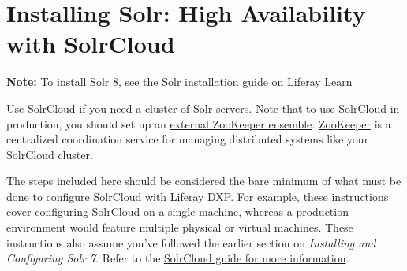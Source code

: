 \section{Installing Solr: High Availability with
SolrCloud}\label{installing-solr-high-availability-with-solrcloud}

\noindent\hrulefill

\textbf{Note:} To install Solr 8, see the Solr installation guide on
\href{https://learn.liferay.com/dxp/latest/en/using-search/installing-and-upgrading-a-search-engine/solr/installing-solr.html}{Liferay
Learn}

\noindent\hrulefill

Use SolrCloud if you need a cluster of Solr servers. Note that to use
SolrCloud in production, you should set up an
\href{https://cwiki.apache.org/confluence/display/solr/Setting+Up+an+External+ZooKeeper+Ensemble}{external
ZooKeeper ensemble}. \href{http://zookeeper.apache.org/}{ZooKeeper} is a
centralized coordination service for managing distributed systems like
your SolrCloud cluster.

The steps included here should be considered the bare minimum of what
must be done to configure SolrCloud with Liferay DXP. For example, these
instructions cover configuring SolrCloud on a single machine, whereas a
production environment would feature multiple physical or virtual
machines. These instructions also assume you've followed the earlier
section on \emph{Installing and Configuring Solr 7}. Refer to the
\href{https://cwiki.apache.org/confluence/display/solr/SolrCloud}{SolrCloud
guide for more information}.

